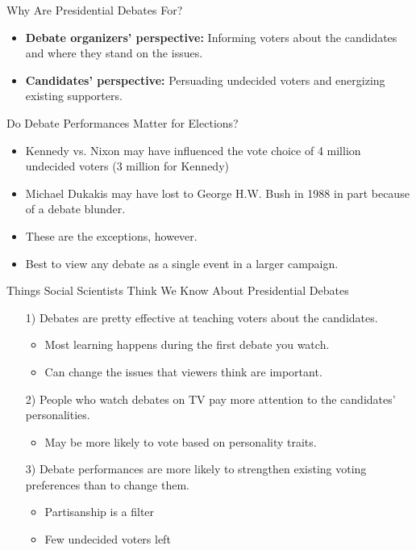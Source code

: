 \documentclass[dvipsnames,aspectratio=169]{beamer}
\newcommand{\pskp}{\pause\bigskip}
\begin{document}
\begin{frame}{Why Are Presidential Debates For?}
    \begin{itemize}
        \item {\bf Debate organizers' perspective:} Informing voters about the candidates and where they stand on the issues.
        \pskp
        \item {\bf Candidates' perspective:} Persuading undecided voters and energizing existing supporters.
    \end{itemize}
\end{frame}

\begin{frame}{Do Debate Performances Matter for Elections?}
    \begin{itemize}
        \item Kennedy vs. Nixon may have influenced the vote choice of 4 million undecided voters (3 million for Kennedy)
        \pskp
        \item Michael Dukakis may have lost to George H.W. Bush in 1988 in part because of a debate blunder.
        \pskp
        \item These are the exceptions, however.
        \pskp
        \item Best to view any debate as a single event in a larger campaign.
    \end{itemize}
\end{frame}

\begin{frame}{Things Social Scientists Think We Know About Presidential Debates}
    \begin{itemize}
        \item[1)] Debates are pretty effective at teaching voters about the candidates.
        \begin{itemize}
            \item Most learning happens during the first debate you watch.
            \item Can change the issues that viewers think are important.
        \end{itemize}
        \pskp
        \item[2)] People who watch debates on TV pay more attention to the candidates' personalities.
        \begin{itemize}
            \item May be more likely to vote based on personality traits.
        \end{itemize}
        \pskp
        \item[3)] Debate performances are more likely to strengthen existing voting preferences than to change them.
        \begin{itemize}
            \item Partisanship is a filter
            \item Few undecided voters left
        \end{itemize} 
    \end{itemize}
\end{frame}
\end{document}
